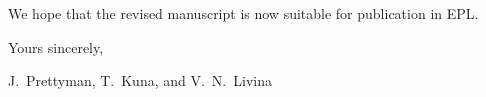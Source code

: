 \documentclass[12pt]{article}
\begin{document}
\begin{itemize}

\end{itemize}

\vspace{7mm}

\noindent
We hope that the revised manuscript is now suitable for publication in EPL.

\vspace{5mm}

\noindent
Yours sincerely,

\vspace{1mm}

\noindent
J.~Prettyman, T.~Kuna, and V.~N.~Livina
\end{document}
